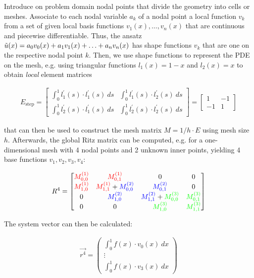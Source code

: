 Introduce on problem domain nodal points that divide the geometry into cells or meshes.
Associate to each nodal variable $a_k$ of a nodal point a local function $v_k$ from
a set of given local basis functions $v_1(x), \ldots, v_n(x)$ that are continuous and piecewise differentiable.
Thus, the ansatz $\tilde{u}(x) = a_0v_0(x)+a_1v_1(x)+\ldots+a_nv_n(x)$ has shape functions $v_k$ that are one on
the respective nodal point $k$.
Then, we use shape functions to represent the PDE on the mesh,
e.g. using triangular functions $l_1(x)=1-x$ and $l_2(x) = x$ to obtain \emph{local} element matrices
\begin{snugshade*}
\begin{align*}
	E_\text{step} =
	\begin{bmatrix}
		\int_0^1 l_1^\prime(s)\cdot l_1^\prime(s)\ ds & \int_0^1 l_1^\prime(s)\cdot l_2^\prime(s)\ ds \\
		\int_0^1 l_2^\prime(s)\cdot l_1^\prime(s)\ ds & \int_0^1 l_2^\prime(s)\cdot l_2^\prime(s)\ ds
	\end{bmatrix}
	=
	\begin{bmatrix}
		1 & -1 \\
		-1 & 1
	\end{bmatrix}
\end{align*}
\end{snugshade*}


that can then be used to construct the mesh matrix $M=1/h\cdot E$ using mesh size $h$.
Afterwards, the global Ritz matrix can be computed, e.g. for a one-dimensional mesh with 4 nodal points and 2 unknown inner points,
yielding 4 base functions $v_1,v_2,v_3,v_4$:

\begin{align*}
	R^4 = \begin{bmatrix}
		{\color{red} M^{(1)}_{0,0}} & \color{red}{M^{(1)}_{0,1}} & 0 & 0 \\
		{\color{red} M^{(1)}_{1,0}} & {\color{red} M^{(1)}_{1,1}} + {\color{blue} M^{(2)}_{0,0}} & {\color{blue} M^{(2)}_{0,1}} & 0 \\
		0 & {\color{blue} M^{(2)}_{1,0}} & {\color{blue} M^{(2)}_{1,1}} + {\color{green} M^{(3)}_{0,0}} & {\color{green} M^{(3)}_{0,1}} \\
		0 & 0 & {\color{green} M^{(3)}_{1,0}} & {\color{green} M^{(3)}_{1,1}}
	\end{bmatrix}
\end{align*}

The system vector can then be calculated:

\begin{align*}
	\vec{r^4} = \begin{pmatrix}
		\int_0^1 f(x)\cdot v_0(x)\ dx \\
		\vdots \\
		\int_0^1 f(x)\cdot v_3(x)\ dx
	\end{pmatrix}
\end{align*}

